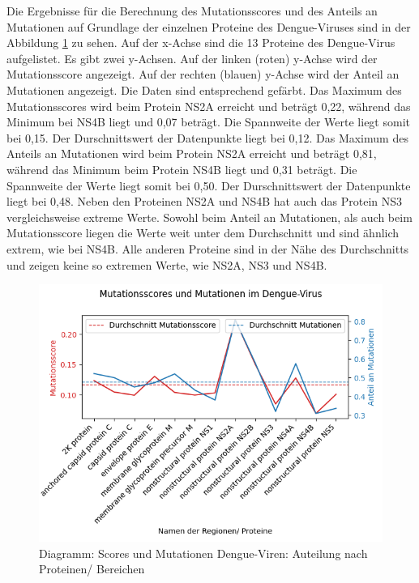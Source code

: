 \documentclass[german,version-2022-01]{uzl-thesis}
\begin{document}
Die Ergebnisse f\"ur die Berechnung des Mutationsscores und des Anteils an Mutationen auf Grundlage der einzelnen Proteine des Dengue-Viruses sind in der Abbildung \ref{fig:Dengue_virus_scores_and_mutations_namen} zu sehen. Auf der x-Achse sind die 13 Proteine des Dengue-Virus aufgelistet. Es gibt zwei y-Achsen. Auf der linken (roten) y-Achse wird der Mutationsscore angezeigt. Auf der rechten (blauen) y-Achse wird der Anteil an Mutationen angezeigt. Die Daten sind entsprechend gef\"arbt. Das Maximum des Mutationsscores wird beim Protein NS2A erreicht und betr\"agt 0,22, w\"ahrend das Minimum bei NS4B liegt und 0,07 betr\"agt. Die Spannweite der Werte liegt somit bei 0,15. Der Durschnittswert der Datenpunkte liegt bei 0,12. Das Maximum des Anteils an Mutationen wird beim Protein NS2A erreicht und betr\"agt 0,81, w\"ahrend das Minimum beim Protein NS4B liegt und 0,31 betr\"agt. Die Spannweite der Werte liegt somit bei 0,50. Der Durschnittswert der Datenpunkte liegt bei 0,48. Neben den Proteinen NS2A und NS4B hat auch das Protein NS3 vergleichsweise extreme Werte. Sowohl beim Anteil an Mutationen, als auch beim Mutationsscore liegen die Werte weit unter dem Durchschnitt und sind \"ahnlich extrem, wie bei NS4B. Alle anderen Proteine sind in der N\"ahe des Durchschnitts und zeigen keine so extremen Werte, wie NS2A, NS3 und NS4B. 
\begin{figure}[tbp]
  \centering
  \includegraphics[scale=0.75]{Images/Diagramm_Scores_und_Mutationen_Dengue_viren_Namen.png}
  \caption{Diagramm: Scores und Mutationen Dengue-Viren: Auteilung nach Proteinen/ Bereichen}
  \label{fig:Dengue_virus_scores_and_mutations_namen}
\end{figure}
\end{document}
